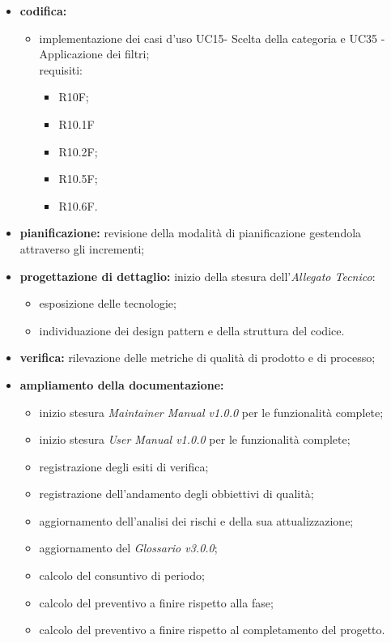 \begin{itemize}
    \item \textbf{codifica:}
          \begin{itemize}
              \item implementazione dei casi d'uso UC15- Scelta della categoria e UC35 - Applicazione dei filtri;\\ requisiti:
                    \begin{itemize}
                        \item R10F;                                                                   \item R10.1F
                        \item R10.2F;
                        \item R10.5F;
                        \item R10.6F.
                    \end{itemize}
          \end{itemize}
    \item \textbf{pianificazione:} revisione della modalità di pianificazione gestendola attraverso gli incrementi;
    \item \textbf{progettazione di dettaglio:} inizio della stesura dell'\textit{Allegato Tecnico}:
          \begin{itemize}
              \item esposizione delle tecnologie;
              \item individuazione dei design pattern e della struttura del codice.
          \end{itemize}
    \item \textbf{verifica:} rilevazione delle metriche di qualità di prodotto e di processo;
    \item \textbf{ampliamento della documentazione:}
          \begin{itemize}
              \item inizio stesura \textit{Maintainer Manual v1.0.0} per le funzionalità complete;
              \item inizio stesura \textit{User Manual v1.0.0} per le funzionalità complete;
              \item registrazione degli esiti di verifica;
              \item registrazione dell'andamento degli obbiettivi di qualità;
              \item aggiornamento dell'analisi dei rischi e della sua attualizzazione;
              \item aggiornamento del \textit{Glossario v3.0.0};
              \item calcolo del consuntivo di periodo;
              \item calcolo del preventivo a finire rispetto alla fase;
              \item calcolo del preventivo a finire rispetto al completamento del progetto.
          \end{itemize}
\end{itemize}
